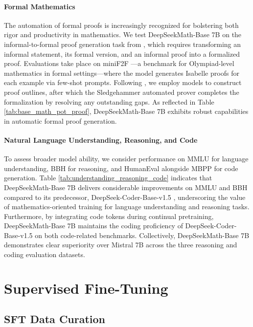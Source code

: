 \begin{itemize}[topsep=0pt]
\paragraph{Formal Mathematics}

The automation of formal proofs is increasingly recognized for bolstering both rigor and productivity in mathematics. We test DeepSeekMath-Base 7B on the informal-to-formal proof generation task from \citep{dsp_proof}, which requires transforming an informal statement, its formal version, and an informal proof into a formalized proof. Evaluations take place on miniF2F \citep{minif2f}—a benchmark for Olympiad-level mathematics in formal settings—where the model generates Isabelle proofs for each example via few-shot prompts. Following \cite{dsp_proof}, we employ models to construct proof outlines, after which the Sledgehammer automated prover \citep{sledgehammer} completes the formalization by resolving any outstanding gaps. As reflected in Table \ref{tab:base_math_pot_proof}, DeepSeekMath-Base 7B exhibits robust capabilities in automatic formal proof generation.

\paragraph{Natural Language Understanding, Reasoning, and Code}

To assess broader model ability, we consider performance on MMLU \citep{mmlu} for language understanding, BBH \citep{bbh} for reasoning, and HumanEval \citep{codex} alongside MBPP \citep{mbpp} for code generation. Table \ref{tab:understanding_reasoning_code} indicates that DeepSeekMath-Base 7B delivers considerable improvements on MMLU and BBH compared to its predecessor, DeepSeek-Coder-Base-v1.5 \citep{deepseek-coder}, underscoring the value of mathematics-oriented training for language understanding and reasoning tasks. Furthermore, by integrating code tokens during continual pretraining, DeepSeekMath-Base 7B maintains the coding proficiency of DeepSeek-Coder-Base-v1.5 on both code-related benchmarks. Collectively, DeepSeekMath-Base 7B demonstrates clear superiority over Mistral 7B \citep{mistral} across the three reasoning and coding evaluation datasets.

\section{Supervised Fine-Tuning}

\subsection{SFT Data Curation}


\end{itemize}
